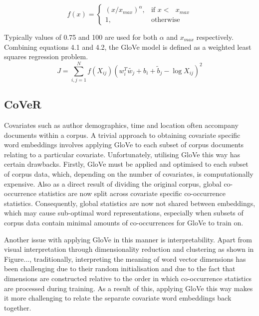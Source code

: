 \begin{equation}
	f(x) =
	\begin{cases}
	(x/x_{max})^{\alpha}, & \text{if  \(x <\) } x_{max} \\
	1, & \text{otherwise}
	\end{cases}
\end{equation}

\noindent
\newline
Typically values of 0.75 and 100 are used for both \( \alpha \) and \(x_{max}\) respectively. Combining equations 4.1 and 4.2, the GloVe model is defined as a weighted least squares regression problem.
\begin{equation}
	J = \sum_{i, j=1}^{N} f(X_{ij}) (w_{i}^{T} \tilde{w_{j}} + b_{i} + \tilde{b}_{j} - \log{X_{ij}})^{2}
\end{equation}
\subsection{CoVeR}
Covariates such as author demographics, time and location often accompany documents within a corpus. A trivial approach to obtaining covariate specific word embeddings involves applying GloVe to each subset of corpus documents relating to a particular covariate. Unfortunately, utilising GloVe this way has certain drawbacks. Firstly, GloVe must be applied and optimised to each subset of corpus data, which, depending on the number of covariates, is computationally expensive. Also as a direct result of dividing the original corpus, global co-occurrence statistics are now split across covariate specific co-occurrence statistics. Consequently, global statistics are now not shared between embeddings, which may cause sub-optimal word representations, especially when subsets of corpus data contain minimal amounts of co-occurrences for GloVe to train on. 

\noindent
\newline
Another issue with applying GloVe in this manner is interpretability. Apart from visual interpretation through dimensionality reduction and clustering as shown in Figure..., traditionally, interpreting the meaning of word vector dimensions has been challenging due to their random initialisation and due to the fact that dimensions are constructed relative to the order in which co-occurrence statistics are processed during training. As a result of this, applying GloVe this way makes it more challenging to relate the separate covariate word embeddings back together.



